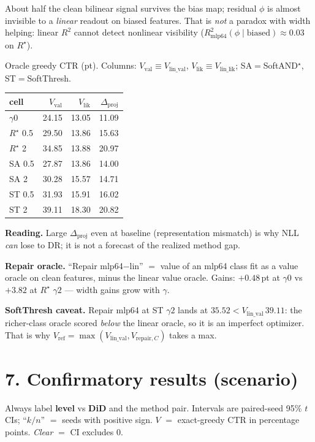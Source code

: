 \documentclass[11pt]{article}
\newcommand{\phonesection}[1]{\Needspace{8\baselineskip}\section*{#1}}
\newcommand{\Rstar}{R^{\star}}
\newcommand{\Dproj}{\Delta_{\mathrm{proj}}}
\begin{document}
About half the clean bilinear signal
survives the bias map; residual $\phi$ is
almost invisible to a \emph{linear} readout
on biased features.  That is \emph{not} a
paradox with width helping: linear $R^{2}$
cannot detect nonlinear visibility
($R^{2}_{\mathrm{mlp64}}(\phi\mid\mathrm{biased})\approx 0.03$
on $\Rstar$).

Oracle greedy CTR (pt). Columns:
$V_{\mathrm{val}}\equiv V_{\mathrm{lin\_val}}$,
$V_{\mathrm{lik}}\equiv V_{\mathrm{lin\_lik}}$;
SA$=$SoftAND$^{\star}$, ST$=$SoftThresh.

\begin{tabularx}{\linewidth}{@{}Xrrr@{}}
\toprule
cell & $V_{\mathrm{val}}$ & $V_{\mathrm{lik}}$ & $\Dproj$ \\
\midrule
$\gamma0$ & 24.15 & 13.05 & 11.09 \\
$\Rstar$ 0.5 & 29.50 & 13.86 & 15.63 \\
$\Rstar$ 2 & 34.85 & 13.88 & 20.97 \\
SA 0.5 & 27.87 & 13.86 & 14.00 \\
SA 2 & 30.28 & 15.57 & 14.71 \\
ST 0.5 & 31.93 & 15.91 & 16.02 \\
ST 2 & 39.11 & 18.30 & 20.82 \\
\bottomrule
\end{tabularx}

\textbf{Reading.}
Large $\Dproj$ even at baseline
(representation mismatch) is why NLL
\emph{can} lose to DR; it is not a forecast
of the realized method gap.

\textbf{Repair oracle.}
``Repair mlp64$-$lin'' $=$ value of an
mlp64 class fit as a value oracle on clean
features, minus the linear value oracle.
Gains: $+0.48$\,pt at $\gamma0$ vs $+3.82$
at $\Rstar$ $\gamma2$ --- width gains grow
with $\gamma$.

\textbf{SoftThresh caveat.}
Repair mlp64 at ST $\gamma2$ lands at
$35.52 < V_{\mathrm{lin\_val}}\,39.11$: the
richer-class oracle scored \emph{below} the
linear oracle, so it is an imperfect
optimizer.  That is why
$V_{\mathrm{ref}}=\max(V_{\mathrm{lin\_val}},
V_{\mathrm{repair},C})$ takes a max.


\phonesection{7. Confirmatory results (scenario)}

Always label \textbf{level} vs \textbf{DiD}
and the method pair. Intervals are
paired-seed 95\% $t$ CIs; ``$k/n$'' $=$ seeds
with positive sign. $V$ $=$ exact-greedy CTR
in percentage points. \emph{Clear} $=$ CI
excludes 0.
\end{document}
